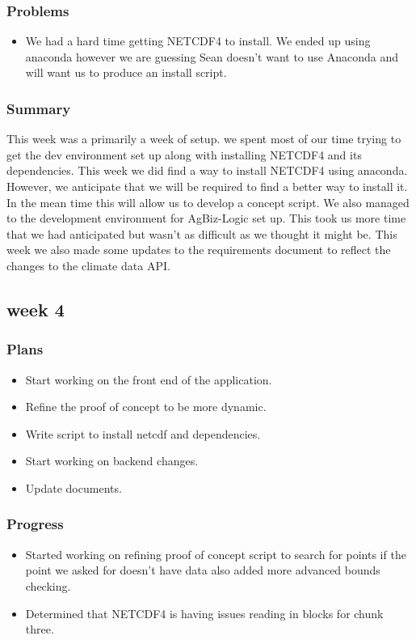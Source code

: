 \documentclass[onecolumn, draftclsnofoot,10pt, compsoc]{article}
\begin{document}
			\subsubsection{Problems}
				\begin{itemize}
					\item We had a hard time getting NETCDF4 to install. We ended up using anaconda however we are guessing Sean doesn't want to use Anaconda and will want us to produce an install script.\\
				\end{itemize}
			\subsubsection{Summary} 
			This week was a primarily a week of setup. we spent most of our time trying to get the dev environment set up along with installing NETCDF4 and its dependencies. This week we did find a way to install NETCDF4 using anaconda. However, we anticipate that we will be required to find a better way to install it. In the mean time this will allow us to develop a concept script. We also managed to the development environment for AgBiz-Logic set up. This took us more time that we had anticipated but wasn't as difficult as we thought it might be. This week we also made some updates to the requirements document to reflect the changes to the climate data API.\\
			
		\subsection{week 4}
			\subsubsection{Plans}
				\begin{itemize}
					\item Start working on the front end of the application.
					\item Refine the proof of concept to be more dynamic.
					\item Write script to install netcdf and dependencies.
					\item Start working on backend changes.
					\item Update documents.
				\end{itemize}
			\subsubsection{Progress}
				\begin{itemize}
					\item Started working on refining proof of concept script to search for points if the point we asked for doesn't have data also added more advanced bounds checking.
					\item Determined that NETCDF4 is having issues reading in blocks for chunk three.
				\end{itemize}
\end{document}
